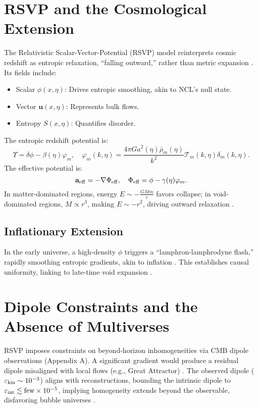 \documentclass{article}
\begin{document}
\section{RSVP and the Cosmological Extension}
\label{sec:rsvp}
The Relativistic Scalar-Vector-Potential (RSVP) model reinterprets cosmic redshift as entropic relaxation, ``falling outward,'' rather than metric expansion \citep{whittle2015}. Its fields include:
\begin{itemize}
    \item Scalar \(\phi(x,\eta)\): Drives entropic smoothing, akin to NCL's null state.
    \item Vector \(\mathbf{u}(x,\eta)\): Represents bulk flows.
    \item Entropy \(S(x,\eta)\): Quantifies disorder.
\end{itemize}

The entropic redshift potential is:
\[
\Upsilon = \delta\phi - \beta(\eta)\varphi_m, \quad \varphi_m(k,\eta) = \frac{4\pi G a^2(\eta) \bar{\rho}_m(\eta)}{k^2} \mathcal{T}_m(k,\eta) \delta_m(k,\eta).
\]
The effective potential is:
\[
\mathbf{a}_{\rm eff} = -\nabla \Phi_{\rm eff}, \quad \Phi_{\rm eff} = \phi - \gamma(\eta) \varphi_m.
\]
In matter-dominated regions, energy \( E \sim -\frac{G M m}{r} \) favors collapse; in void-dominated regions, \( M \propto r^3 \), making \( E \sim -r^2 \), driving outward relaxation \citep{whittle2015}.

\subsection{Inflationary Extension}
In the early universe, a high-density \(\phi\) triggers a ``lamphron-lamphrodyne flash,'' rapidly smoothing entropic gradients, akin to inflation \citep{whittle2015}. This establishes causal uniformity, linking to late-time void expansion \citep{desitter1917}.

\section{Dipole Constraints and the Absence of Multiverses}
\label{sec:dipole}
RSVP imposes constraints on beyond-horizon inhomogeneities via CMB dipole observations (Appendix A). A significant gradient would produce a residual dipole misaligned with local flows (e.g., Great Attractor) \citep{riess1998, perlmutter1999}. The observed dipole (\(\varepsilon_{\rm kin} \sim 10^{-3}\)) aligns with reconstructions, bounding the intrinsic dipole to \(\varepsilon_{\rm int} \lesssim \text{few} \times 10^{-5}\), implying homogeneity extends beyond the observable, disfavoring bubble universes \citep{dodelson2003}.
\end{document}
